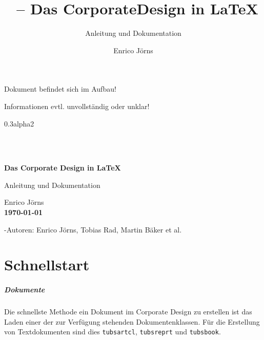 \documentclass[a4paper,11pt]{tubsreprt}
\title{\tubslatex\ -- Das CorporateDesign in \LaTeX}
\subtitle{Anleitung und Dokumentation}
\author{Enrico Jörns}
\begin{document}
\pagestyle{empty}
\hfill
\begin{center}
\huge\color{tuRed}
Dokument befindet sich im Aufbau!\bigskip

Informationen evtl. unvollständig oder unklar!
\end{center}
\vspace*{3cm}
\begin{center}
\LARGE\tubslatex 0.3alpha2
\end{center}

\newpage~\newpage

\begin{titlepage}
  \showtubslogo
  \showtopline
  \begin{segment}{2}
    \centering
    \Huge \tubslatex\\[\medskipamount]
    \bfseries\huge Das Corporate Design in \LaTeX
  \end{segment}
  \begin{segment}{1}
    \centering
    \LARGE Anleitung und Dokumentation
  \end{segment}
  \begin{segment}{2}
    \centering
    \Large Enrico Jörns\\[\bigskipamount]
    \bfseries\today
  \end{segment}
  \begin{segment}{3}
    \Large \tubslatex-Autoren: Enrico Jörns, Tobias Rad, Martin Bäker et al.
  \end{segment}
\end{titlepage}



\pagestyle{scrheadings}
\tableofcontents


\newcommand{\newdocumentclass}[1]{\textcolor{tuRed}{\lstinline{#1}}}
\newcommand{\newpackage}[1]{\textcolor{tuRed}{\lstinline{#1}}}



\chapter{Schnellstart}\label{chap:rapid}


\paragraph{Dokumente}
Die schnellste Methode ein Dokument im Corporate Design zu erstellen ist
das Laden einer der zur Verfügung stehenden Dokumentenklassen.
Für die Erstellung von Textdokumenten sind dies \newdocumentclass{tubsartcl},
\newdocumentclass{tubsreprt} und \newdocumentclass{tubsbook}.
\end{document}
